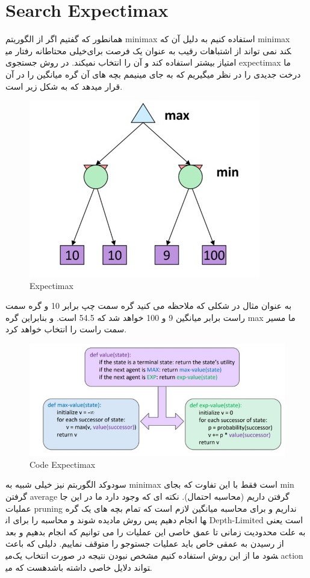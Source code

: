 \section{Search Expectimax}
همانطور که گفتیم اگر از الگوریتم minimax استفاده کنیم به دلیل آن که minimax خیلی محتاطانه رفتار می‎کند نمی تواند از اشتباهات رقیب به عنوان یک فرصت برای امتیاز بیشتر استفاده کند و آن را انتخاب نمیکند.
در روش جستجوی expectimax ما درخت جدیدی را در نظر میگیریم که به جای مینیمم بچه های آن گره میانگین را در آن قرار میدهد که به شکل زیر است.


\begin{figure}[h!]
    \centering
    \includegraphics[width=0.4\linewidth]{images/expectimax01.jpg}
    \caption{Expectimax}
\end{figure}

به عنوان مثال در شکلی که ملاحظه می کنید گره سمت چپ برابر 10 و گره سمت راست برابر میانگین 9 و 100 خواهد شد که 54.5 است. و بنابراین گره max ما مسیر سمت راست را انتخاب خواهد کرد.

\begin{figure}[h!]
    \centering
    \includegraphics[width=0.8\linewidth]{images/expectimax02.jpg}
    \caption{Code Expectimax}
\end{figure}

سودوکد الگوربتم نیز خیلی شبیه به minimax است فقط با این تفاوت که بجای min گرفتن average گرفتن داریم (محاسبه احتمال).  نکته ای که وجود دارد ما در این جا عملیات pruning نداریم و برای محاسبه میانگین لازم است که تمام بچه های یک گره دیده شوند و محاسبه را برای ان‎ها انجام دهیم پس روش ما Depth-Limited است یعنی به علت محدودیت زمانی تا عمق خاصی این عملیات را می توانیم که انجام بدهیم و بعد از رسیدن به عمقی خاص باید عملیات جستوجو را متوقف نماییم.
دلیلی که باعث می‎شود ما از این روش استفاده کنیم مشخص نبودن نتیجه در صورت انتخاب یک action  هست که می‎تواند دلایل خاصی داشته باشد.

